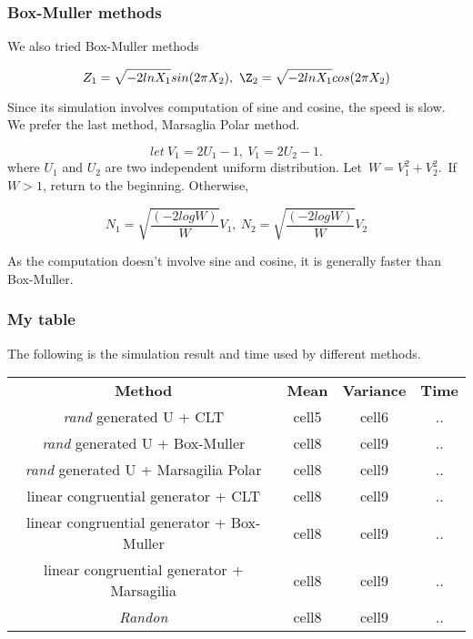 \documentclass{beamer}
\begin{document}
\begin{frame}
\frametitle{Box-Muller methods}

We also tried Box-Muller methods

$$Z_1 = \sqrt{-2lnX_1}sin(2\pi X_2),\  \Z_2=\sqrt{-2lnX_1}cos(2\pi X_2)$$

Since its simulation involves computation of sine and cosine, the speed is slow.
We prefer the last method, Marsaglia Polar method.

$$ let \ V_1 = 2U_1-1,\  V_1 = 2U_2-1.$$
where $U_1$ and $U_2$ are two independent uniform distribution.
 Let\ $W = V_1^2+V_2^2.$\ If $W>1$, return to the beginning. Otherwise,

$$N_1 = \sqrt{\frac{(-2logW)}{W}}V_1,\ N_2 = \sqrt{\frac{(-2logW)}{W}}V_2$$

As the computation doesn’t involve sine and cosine, it is generally faster than Box-Muller.
\end{frame}


\begin{frame}
\frametitle{My table}

The following is the simulation result and time used by different methods.
\begin{center}
\begin{tabular}{ c c c c }
\textbf{ Method} &\textbf{ Mean} & \textbf{Variance}&\textbf{ Time} \\
\textit{ rand} generated U + CLT & cell5 & cell6&.. \\
\textit{ rand} generated U + Box-Muller & cell8 & cell9&..\\
\textit{ rand} generated U + Marsagilia Polar & cell8 & cell9&..\\
 linear congruential generator + CLT & cell8 & cell9&..\\
linear congruential generator + Box-Muller & cell8 & cell9&..\\
 linear congruential generator + Marsagilia & cell8 & cell9&..\\
\textit{Randon} & cell8 & cell9&..

\end{tabular}
\end{center}


\end{frame}
\end{document}
